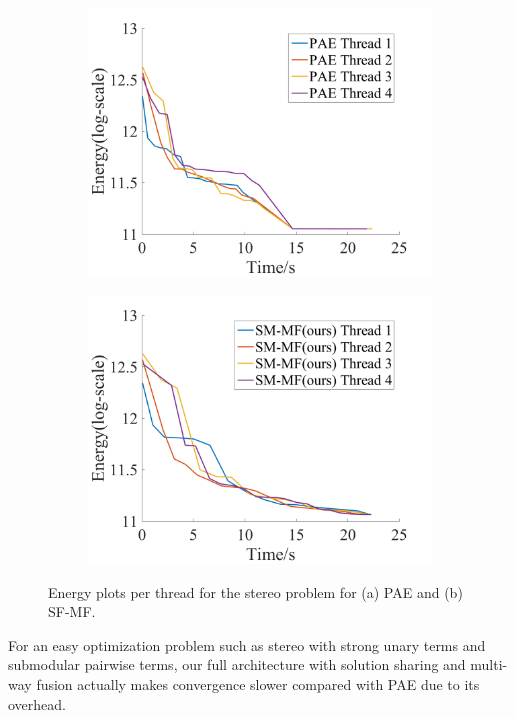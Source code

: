 \begin{figure}[!h]
\centering
\begin{subfigure}{0.49\textwidth}
\includegraphics[width=\textwidth]{figure/stereo_thread_pae.png}
\caption{}
\end{subfigure}
\begin{subfigure}{0.49\textwidth}
\includegraphics[width=\textwidth]{figure/stereo_thread_sf.png}
\caption{}
\end{subfigure}
\caption{Energy plots per thread for the stereo problem for (a) PAE and (b)
SF-MF.}
\label{fig:stereo_threads}
\end{figure}

For an easy optimization problem such as stereo with strong unary
terms and submodular pairwise terms, our full architecture with
solution sharing and multi-way fusion actually makes convergence
slower compared with PAE due to its overhead.




